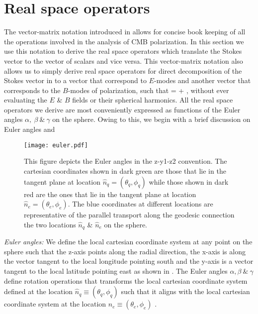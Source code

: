 \section{Real space operators} \label{sec:real_space_operators}
The vector-matrix notation introduced in   allows for concise book keeping of all the operations involved in the analysis of CMB polarization. In this section we use this notation to derive the real space operators which translate the Stokes vector \vp{}  to the vector of scalars \vs  and vice versa. This vector-matrix notation also allows us to simply derive real space operators for direct decomposition of the Stokes vector \vp{} in to a vector  that correspond to $E$-modes and another vector  that corresponds to the $B$-modes of polarization, such that \vp{} =  + , without ever evaluating the $E$ \& $B$ fields or their spherical harmonics. 
All the real space operators we derive are most conveniently expressed as functions of the Euler angles  $\alpha, ~\beta~\&~ \gamma$ on the sphere. Owing to this, we begin with a brief discussion on Euler angles and 
%
\begin{figure}[!hbt]
\centering
\texttt{[image: euler.pdf]}
\caption{This figure depicts the Euler angles in the z-y1-z2 convention. The cartesian coordinates shown in dark green are those that lie in the tangent plane at location $\hat{n}_q = (\theta_q, \phi_q)$ while those shown in dark red are the ones that lie in the tangent plane at location $\hat{n}_e = (\theta_e, \phi_e)$. The blue coordinates at different locations are representative of the parallel transport along the geodesic connection the two locations $\hat{n}_q$ \& $\hat{n}_e$ on the sphere.}
\label{fig:euler_angles}
\end{figure}
%

\textit{Euler angles:}  We define the local cartesian coordinate system at any point on the sphere such that the z-axis points along the radial direction, the x-axis is along the vector tangent to the local longitude pointing south and the y-axis is a vector tangent to the local latitude pointing east as shown in . The Euler angles $\alpha ,\beta ~\&~ \gamma$ define rotation operations that transforms the local cartesian coordinate system defined at the location $\hat{n}_q \equiv (\theta_q,\phi_q)$ such that it aligns with the local cartesian coordinate system at the location $\hat{n}_e \equiv (\theta_e,\phi_e)$ \cite{varshalovich}. 

